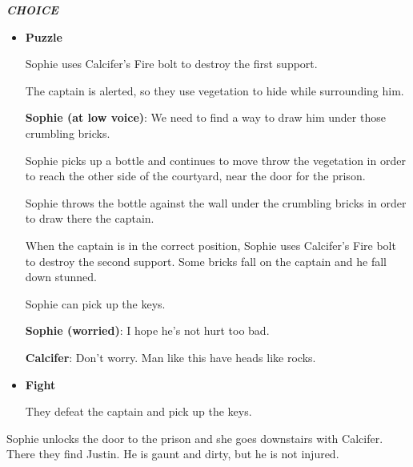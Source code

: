 \textit{\textbf{CHOICE}}
\begin{itemize}
  \item \textbf{Puzzle}
  
  Sophie uses Calcifer's Fire bolt to destroy the first support.
  
  The captain is alerted, so they use vegetation to hide while surrounding him.
  
  \textbf{Sophie (at low voice)}: We need to find a way to draw him under those crumbling bricks.
  
  Sophie picks up a bottle and continues to move throw the vegetation in order to reach the other side of the courtyard, near the door for the prison.
  
  Sophie throws the bottle against the wall under the crumbling bricks in order to draw there the captain.
  
  When the captain is in the correct position, Sophie uses Calcifer's Fire bolt to destroy the second support. Some bricks fall on the captain and he fall down stunned.
  
  Sophie can pick up the keys.
  
  \textbf{Sophie (worried)}: I hope he's not hurt too bad.
  
  \textbf{Calcifer}: Don't worry. Man like this have heads like rocks.

  \item \textbf{Fight}

  They defeat the captain and pick up the keys.
\end{itemize}


Sophie unlocks the door to the prison and she goes downstairs with Calcifer. There they find Justin. He is gaunt and dirty, but he is not injured.

